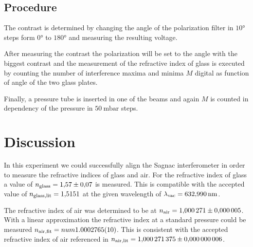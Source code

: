 \subsection{Procedure}
The contrast is determined by changing the angle of the polarization filter in
$10°$ steps form $0°$ to $180°$ and measuring the resulting voltage.

After measuring the contrast the polarization will be set to the angle with the
biggest contrast and the measurement of the refractive index of glass is
executed by counting the number of interference maxima and minima $M$ digital
as function of angle of the two glass plates.

Finally, a pressure tube is inserted in one of the beams and again $M$ is
counted in dependency of the pressure in $\qty{50}{\milli\bar}$ steps.

\newpage



\section{Discussion}
In this experiment we could successfully align the Sagnac interferometer in
order to measure the refractive indices of glass and air. For the refractive
index of glass a value of $n_\t{glass} = \num{1.57(7)}$ is measured. This is
compatible with the accepted value of $n_\t{glass,lit} = \num{1.5151}$
\cite{web:refglass} at the given wavelength of $\lambda_\t{vac} = \qty{632,990}{\nm}$.

The refractive index of air was determined to be at $n_\t{air}=\num{1.000271(5)}$. 
With a linear approximation the refractive index at a standard pressure
could be measured $n_\t{air,fit} = num{1.0002765 (10)}$. This is consistent with
the accepted refractive index of air referenced in \cite*{atc:2011AmJP}
$n_\t{air,lit} = \num{1.000271375(6)}$. 

\newpage
\printbibliography


